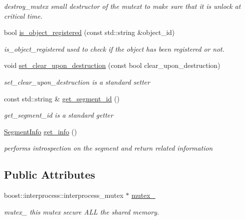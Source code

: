 \begin{DoxyCompactItemize}
\begin{DoxyCompactList}\small\item\em destroy\+\_\+mutex small destructor of the mutext to make sure that it is unlock at critical time. \end{DoxyCompactList}\item 
bool \hyperlink{classshared__memory_1_1SharedMemorySegment_ae7a86bba2f8158917b48c0bd3a7bdf9b}{is\+\_\+object\+\_\+registered} (const std\+::string \&object\+\_\+id)
\begin{DoxyCompactList}\small\item\em is\+\_\+object\+\_\+registered used to check if the object has been registered or not. \end{DoxyCompactList}\item 
void \hyperlink{classshared__memory_1_1SharedMemorySegment_ae2eb51704f44076db6ce79054e9d2572}{set\+\_\+clear\+\_\+upon\+\_\+destruction} (const bool clear\+\_\+upon\+\_\+destruction)
\begin{DoxyCompactList}\small\item\em set\+\_\+clear\+\_\+upon\+\_\+destruction is a standard setter \end{DoxyCompactList}\item 
const std\+::string \& \hyperlink{classshared__memory_1_1SharedMemorySegment_ab7f1f01a94d4e45ed907be9bcdb71a24}{get\+\_\+segment\+\_\+id} ()
\begin{DoxyCompactList}\small\item\em get\+\_\+segment\+\_\+id is a standard getter \end{DoxyCompactList}\item 
\hyperlink{classshared__memory_1_1SegmentInfo}{Segment\+Info} \hyperlink{classshared__memory_1_1SharedMemorySegment_aa742cf04463a94a51239b96de2da6947}{get\+\_\+info} ()\hypertarget{classshared__memory_1_1SharedMemorySegment_aa742cf04463a94a51239b96de2da6947}{}\label{classshared__memory_1_1SharedMemorySegment_aa742cf04463a94a51239b96de2da6947}

\begin{DoxyCompactList}\small\item\em performs introspection on the segment and return related information \end{DoxyCompactList}\end{DoxyCompactItemize}
\subsection*{Public Attributes}
\begin{DoxyCompactItemize}
\item 
boost\+::interprocess\+::interprocess\+\_\+mutex $\ast$ \hyperlink{classshared__memory_1_1SharedMemorySegment_a9e72fec52b3c76b9c2b0809b40b4e11d}{mutex\+\_\+}\hypertarget{classshared__memory_1_1SharedMemorySegment_a9e72fec52b3c76b9c2b0809b40b4e11d}{}\label{classshared__memory_1_1SharedMemorySegment_a9e72fec52b3c76b9c2b0809b40b4e11d}

\begin{DoxyCompactList}\small\item\em mutex\+\_\+ this mutex secure A\+LL the shared memory. \end{DoxyCompactList}\end{DoxyCompactItemize}
